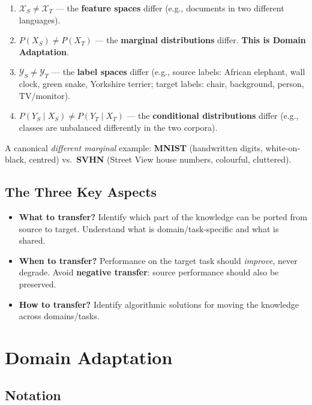 \documentclass[11pt,a4paper]{article}
\theoremstyle{definition}
\theoremstyle{plain}
\theoremstyle{remark}
\begin{document}
\begin{enumerate}
    \item $\mathcal{X}_S \neq \mathcal{X}_T$ --- the \textbf{feature spaces} differ (e.g., documents in two different languages).
    \item $P(X_S) \neq P(X_T)$ --- the \textbf{marginal distributions} differ. \textbf{This is Domain Adaptation}.
    \item $\mathcal{Y}_S \neq \mathcal{Y}_T$ --- the \textbf{label spaces} differ (e.g., source labels: African elephant, wall clock, green snake, Yorkshire terrier; target labels: chair, background, person, TV/monitor).
    \item $P(Y_S\mid X_S) \neq P(Y_T\mid X_T)$ --- the \textbf{conditional distributions} differ (e.g., classes are unbalanced differently in the two corpora).
\end{enumerate}

A canonical \emph{different marginal} example: \textbf{MNIST} (handwritten digits, white-on-black, centred) vs.\ \textbf{SVHN} (Street View house numbers, colourful, cluttered).

\subsection{The Three Key Aspects}

\begin{tcolorbox}[colback=yellow!5!white,colframe=orange!80!black,title=\textbf{What, When, How to Transfer}]
\begin{itemize}[leftmargin=*]
    \item \textbf{What to transfer?} Identify which part of the knowledge can be ported from source to target. Understand what is domain/task-specific and what is shared.
    \item \textbf{When to transfer?} Performance on the target task should \emph{improve}, never degrade. Avoid \textbf{negative transfer}: source performance should also be preserved.
    \item \textbf{How to transfer?} Identify algorithmic solutions for moving the knowledge across domains/tasks.
\end{itemize}
\end{tcolorbox}


\section{Domain Adaptation}

\subsection{Notation}
\end{document}
